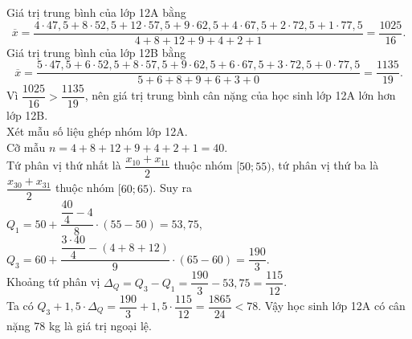 \begin{ex}
{\begin{itemchoice}
\begin{center}
\begin{tabular}{|c|c|c|c|c|c|c|c|c|}
					\hline
				\end{tabular}
			\end{center}
			 Giá trị trung bình của lớp 12A bằng
			 $$\overline{x}=\dfrac{4\cdot 47{,}5+8\cdot 52{,}5+12\cdot 57{,}5+9\cdot 62{,}5+4\cdot 67{,}5+2\cdot 72{,}5+1\cdot 77{,}5}{4+8 +12+9+4+2+1}=\dfrac{1025}{16}.$$
			  Giá trị trung bình của lớp 12B bằng
			 $$\overline{x}=\dfrac{5\cdot 47{,}5+6\cdot 52{,}5+8\cdot 57{,}5+9\cdot 62{,}5+6\cdot 67{,}5+3\cdot 72{,}5+0\cdot 77{,}5}{5+6+8+9+6+3+0}=\dfrac{1135}{19}.$$
			 Vì $\dfrac{1025}{16}>\dfrac{1135}{19}$, nên giá trị trung bình cân nặng của học sinh lớp 12A  lớn hơn lớp 12B.
			\\
			Xét mẫu số liệu ghép nhóm lớp 12A.\\
			Cỡ mẫu $n= 4+8 +12+9+4+2+1= 40$.\\
			Tứ phân vị thứ nhất là $\dfrac{x_{10}+x_{11}}{2}$ thuộc nhóm $[50; 55)$, tứ phân vị thứ ba là $\dfrac{x_{30}+x_{31}}{2}$ thuộc nhóm $[60; 65)$. Suy ra\\
			$Q_1=50+\dfrac{\dfrac{40}{4}-4}{8}\cdot(55-50)= 53{,}75$,\\ $Q_3=60+\dfrac{\dfrac{3\cdot40}{4}-(4+8+12)}{9}\cdot(65-60)= \dfrac{190}{3}$.\\
			Khoảng tứ phân vị $\Delta_Q=Q_3-Q_1=\dfrac{190}{3}-53{,}75=\dfrac{115}{12}$.\\
			Ta có $Q_3+1{,}5\cdot\Delta_Q=\dfrac{190}{3}+1{,}5\cdot\dfrac{115}{12}=\dfrac{1865}{24}<78$. Vậy học sinh lớp 12A có cân nặng $78$ kg là giá trị ngoại lệ.
				\end{itemchoice}
	}
\end{ex}

